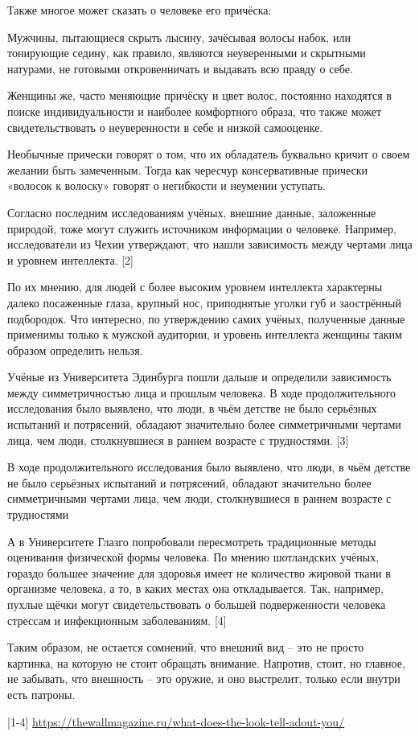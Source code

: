 Также многое может сказать о человеке его причёска:

Мужчины, пытающиеся скрыть лысину, зачёсывая волосы набок, или тонирующие седину, как правило, являются неуверенными и скрытными натурами, не готовыми откровенничать и выдавать всю правду о себе.

Женщины же, часто меняющие причёску и цвет волос, постоянно находятся в поиске индивидуальности и наиболее комфортного образа, что также может свидетельствовать о неуверенности в себе и низкой самооценке.

Необычные прически говорят о том, что их обладатель буквально кричит о своем желании быть замеченным. Тогда как чересчур консервативные прически «волосок к волоску» говорят о негибкости и неумении уступать.

Согласно последним исследованиям учёных, внешние данные, заложенные природой, тоже могут служить источником информации о человеке. Например, исследователи из Чехии утверждают, что нашли зависимость между чертами лица и уровнем интеллекта. [2]

По их мнению, для людей с более высоким уровнем интеллекта характерны далеко посаженные глаза, крупный нос, приподнятые уголки губ и заострённый подбородок.  Что интересно, по утверждению самих учёных, полученные данные применимы только к мужской аудитории, и уровень интеллекта женщины таким образом определить нельзя.

Учёные из Университета Эдинбурга пошли дальше и определили зависимость между симметричностью лица и прошлым человека. В ходе продолжительного исследования было выявлено, что люди, в чьём детстве не было серьёзных испытаний и потрясений, обладают значительно более симметричными чертами лица, чем люди, столкнувшиеся в раннем возрасте с трудностями. [3]

\begin{fancyquotes}
    В ходе продолжительного исследования было выявлено, что люди, в чьём детстве не было серьёзных испытаний и потрясений, обладают значительно более симметричными чертами лица, чем люди, столкнувшиеся в раннем возрасте с трудностями
\end{fancyquotes}

А в Университете Глазго попробовали пересмотреть традиционные методы оценивания физической формы человека. По мнению шотландских учёных, гораздо большее значение для здоровья имеет не количество жировой ткани в организме человека, а то, в каких местах она откладывается. Так, например, пухлые щёчки могут свидетельствовать о большей подверженности человека стрессам и инфекционным заболеваниям. [4]

Таким образом, не остается сомнений, что внешний вид – это не просто картинка, на которую не стоит обращать внимание. Напротив, стоит, но главное, не забывать, что внешность – это оружие, и оно выстрелит, только если внутри есть патроны.

[1-4]  \url{https://thewallmagazine.ru/what-does-the-look-tell-adout-you/}
